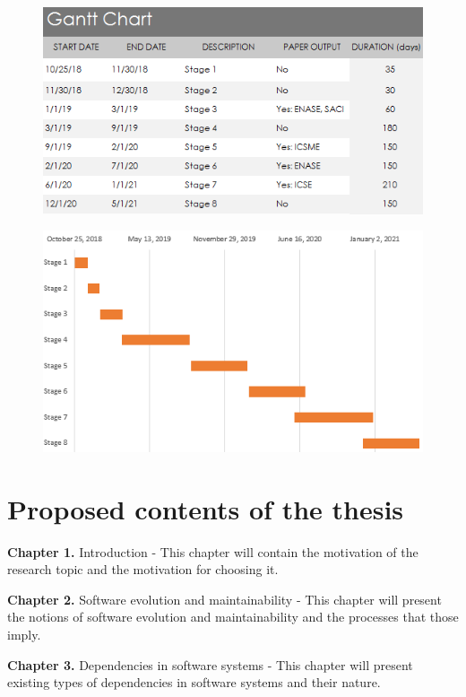\documentclass[12pt]{mitthesis}
\begin{document}
\begin{figure}[H]
\centering
\includegraphics[width=\textwidth]{gantt_chart.PNG}
\label{fig:gantt1}
\end{figure}

\begin{figure}[H]
\centering
\includegraphics[width=\textwidth]{gantt_plot.PNG}
\label{fig:gantt2}
\end{figure}

\section{Proposed contents of the thesis}

 	\textbf{Chapter 1.} Introduction - This chapter will contain the motivation of the research topic and the motivation for choosing it.

\textbf{Chapter 2.} Software evolution and maintainability - This chapter will present the notions of software evolution and maintainability and the processes that those imply.

\textbf{Chapter 3.} Dependencies in software systems - This chapter will present existing types of dependencies in software systems and their nature.
\end{document}
